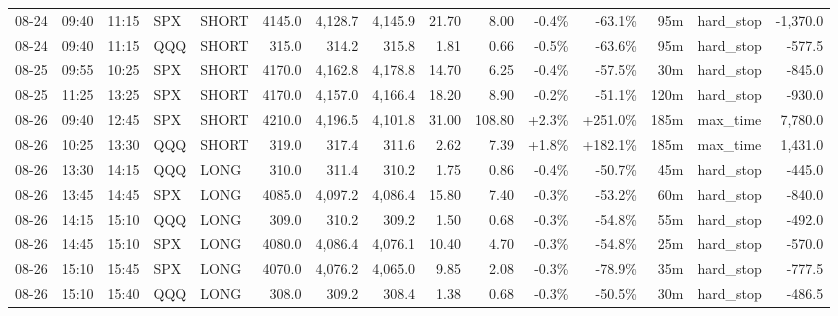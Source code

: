 \documentclass[11pt,a4paper,twoside]{article}
\begin{document}
\begin{landscape}
\begin{center}
\begin{longtable}{>{\color{txtmain}}l l l l l r r r r r r r r >{\color{txtmain}}l r}
08-24 & 09:40 & 11:15 & SPX & SHORT & 4145.0 & 4,128.7 & 4,145.9 & 21.70 & 8.00 & \textcolor{lossred}{-0.4\%} & \textcolor{lossred}{-63.1\%} & 95m & hard\_stop & \textcolor{lossred}{-1,370.0} \\
08-24 & 09:40 & 11:15 & QQQ & SHORT & 315.0 & 314.2 & 315.8 & 1.81 & 0.66 & \textcolor{lossred}{-0.5\%} & \textcolor{lossred}{-63.6\%} & 95m & hard\_stop & \textcolor{lossred}{-577.5} \\
08-25 & 09:55 & 10:25 & SPX & SHORT & 4170.0 & 4,162.8 & 4,178.8 & 14.70 & 6.25 & \textcolor{lossred}{-0.4\%} & \textcolor{lossred}{-57.5\%} & 30m & hard\_stop & \textcolor{lossred}{-845.0} \\
08-25 & 11:25 & 13:25 & SPX & SHORT & 4170.0 & 4,157.0 & 4,166.4 & 18.20 & 8.90 & \textcolor{lossred}{-0.2\%} & \textcolor{lossred}{-51.1\%} & 120m & hard\_stop & \textcolor{lossred}{-930.0} \\
08-26 & 09:40 & 12:45 & SPX & SHORT & 4210.0 & 4,196.5 & 4,101.8 & 31.00 & 108.80 & \textcolor{wingreen}{+2.3\%} & \textcolor{wingreen}{+251.0\%} & 185m & max\_time & \textcolor{wingreen}{7,780.0} \\
08-26 & 10:25 & 13:30 & QQQ & SHORT & 319.0 & 317.4 & 311.6 & 2.62 & 7.39 & \textcolor{wingreen}{+1.8\%} & \textcolor{wingreen}{+182.1\%} & 185m & max\_time & \textcolor{wingreen}{1,431.0} \\
08-26 & 13:30 & 14:15 & QQQ & LONG & 310.0 & 311.4 & 310.2 & 1.75 & 0.86 & \textcolor{lossred}{-0.4\%} & \textcolor{lossred}{-50.7\%} & 45m & hard\_stop & \textcolor{lossred}{-445.0} \\
08-26 & 13:45 & 14:45 & SPX & LONG & 4085.0 & 4,097.2 & 4,086.4 & 15.80 & 7.40 & \textcolor{lossred}{-0.3\%} & \textcolor{lossred}{-53.2\%} & 60m & hard\_stop & \textcolor{lossred}{-840.0} \\
08-26 & 14:15 & 15:10 & QQQ & LONG & 309.0 & 310.2 & 309.2 & 1.50 & 0.68 & \textcolor{lossred}{-0.3\%} & \textcolor{lossred}{-54.8\%} & 55m & hard\_stop & \textcolor{lossred}{-492.0} \\
08-26 & 14:45 & 15:10 & SPX & LONG & 4080.0 & 4,086.4 & 4,076.1 & 10.40 & 4.70 & \textcolor{lossred}{-0.3\%} & \textcolor{lossred}{-54.8\%} & 25m & hard\_stop & \textcolor{lossred}{-570.0} \\
08-26 & 15:10 & 15:45 & SPX & LONG & 4070.0 & 4,076.2 & 4,065.0 & 9.85 & 2.08 & \textcolor{lossred}{-0.3\%} & \textcolor{lossred}{-78.9\%} & 35m & hard\_stop & \textcolor{lossred}{-777.5} \\
08-26 & 15:10 & 15:40 & QQQ & LONG & 308.0 & 309.2 & 308.4 & 1.38 & 0.68 & \textcolor{lossred}{-0.3\%} & \textcolor{lossred}{-50.5\%} & 30m & hard\_stop & \textcolor{lossred}{-486.5} \\

\end{longtable}
\end{center}
\end{landscape}
\end{document}
